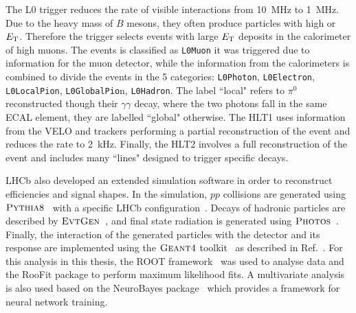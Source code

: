 The L0 trigger reduces the rate of visible interactions from 10~MHz to 1~MHz.
Due to the heavy mass of $B$ mesons, they often produce particles with high \pt or $E_{\rm T}$.
Therefore the trigger selects events with large $E_{\rm T}$ deposits in the calorimeter
of high \pt muons. The events is classified as \verb!L0Muon! it was triggered due to information
for the muon detector, while the information from the calorimeters is combined to divide the
events in the 5 categories: \verb!L0Photon!, \verb!L0Electron!, \verb!L0LocalPion!, \verb!L0GlobalPio!n, \verb!L0Hadron!. 
The label ``local" refers to $\pi^0$ reconstructed though their $\gamma\gamma$ decay, where the two photons
fall in the same ECAL element, they are labelled ``global" otherwise.
The HLT1 uses information from the VELO and trackers performing a partial reconstruction
of the event and reduces the rate to 2~kHz. Finally, the HLT2 involves a full reconstruction of the
event and includes many ``lines" designed to trigger specific decays.

LHCb also developed an extended simulation software in order to reconstruct efficiencies and signal shapes.
In the simulation, $pp$ collisions are generated using $\textsc{Pythia}8$~\cite{Sjostrand:2006za} with a specific
LHCb configuration~\cite{LHCb-PROC-2010-056}. Decays of hadronic particles are described by $\textsc{EvtGen}$~\cite{Lange:2001uf},
and final state radiation is generated using $\textsc{Photos}$~\cite{Golonka:2005pn}. Finally, the interaction of the generated
particles with the detector and its response are implemented using the $\textsc{Geant4}$ toolkit~\cite{Allison:2006ve}
as described in Ref.~\cite{LHCb-PROC-2011-006}. For this analysis in this thesis, the ROOT framework~\cite{Brun:2000es} was
used to analyse data and the RooFit package to perform maximum likelihood fits. A multivariate analysis is also used
based on the NeuroBayes package~\cite{Feindt:2006pm,feindt-2004} which provides a framework for neural network training.







